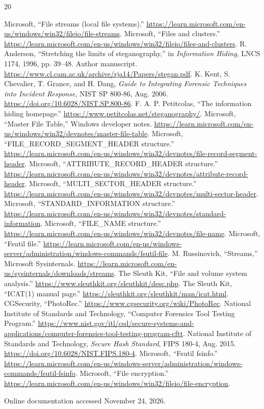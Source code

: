 \begin{thebibliography}{20}
 Microsoft, ``File streams (local file systems).''
\url{https://learn.microsoft.com/en-us/windows/win32/fileio/file-streams}.
 Microsoft, ``Files and clusters.''
\url{https://learn.microsoft.com/en-us/windows/win32/fileio/files-and-clusters}.
 R. Anderson, ``Stretching the limits of steganography,'' in
\emph{Information Hiding}, LNCS 1174, 1996, pp. 39--48. Author manuscript.
\url{https://www.cl.cam.ac.uk/archive/rja14/Papers/stegan.pdf}.
 K. Kent, S. Chevalier, T. Grance, and H. Dang,
\emph{Guide to Integrating Forensic Techniques into Incident Response},
NIST SP 800-86, Aug. 2006. \url{https://doi.org/10.6028/NIST.SP.800-86}.
 F. A. P. Petitcolas, ``The information hiding homepage.''
\url{https://www.petitcolas.net/steganography/}.
 Microsoft, ``Master File Table,'' Windows developer notes.
\url{https://learn.microsoft.com/en-us/windows/win32/devnotes/master-file-table}.
 Microsoft, ``FILE\_RECORD\_SEGMENT\_HEADER structure.''
\url{https://learn.microsoft.com/en-us/windows/win32/devnotes/file-record-segment-header}.
 Microsoft, ``ATTRIBUTE\_RECORD\_HEADER structure.''
\url{https://learn.microsoft.com/en-us/windows/win32/devnotes/attribute-record-header}.
 Microsoft, ``MULTI\_SECTOR\_HEADER structure.''
\url{https://learn.microsoft.com/en-us/windows/win32/devnotes/multi-sector-header}.
 Microsoft, ``STANDARD\_INFORMATION structure.''
\url{https://learn.microsoft.com/en-us/windows/win32/devnotes/standard-information}.
 Microsoft, ``FILE\_NAME structure.''
\url{https://learn.microsoft.com/en-us/windows/win32/devnotes/file-name}.
 Microsoft, ``Fsutil file.''
\url{https://learn.microsoft.com/en-us/windows-server/administration/windows-commands/fsutil-file}.
 M. Russinovich, ``Streams,'' Microsoft Sysinternals.
\url{https://learn.microsoft.com/en-us/sysinternals/downloads/streams}.
 The Sleuth Kit, ``File and volume system analysis.''
\url{https://www.sleuthkit.org/sleuthkit/desc.php}.
 The Sleuth Kit, ``ICAT(1) manual page.''
\url{https://sleuthkit.org/sleuthkit/man/icat.html}.
 CGSecurity, ``PhotoRec.''
\url{https://www.cgsecurity.org/wiki/PhotoRec}.
 National Institute of Standards and Technology,
``Computer Forensics Tool Testing Program.''
\url{https://www.nist.gov/itl/csd/secure-systems-and-applications/computer-forensics-tool-testing-program-cftt}.
 National Institute of Standards and Technology,
\emph{Secure Hash Standard}, FIPS 180-4, Aug. 2015.
\url{https://doi.org/10.6028/NIST.FIPS.180-4}.
 Microsoft, ``Fsutil fsinfo.''
\url{https://learn.microsoft.com/en-us/windows-server/administration/windows-commands/fsutil-fsinfo}.
 Microsoft, ``File encryption.''
\url{https://learn.microsoft.com/en-us/windows/win32/fileio/file-encryption}.
\end{thebibliography}
\noindent Online documentation accessed November 24, 2026.
